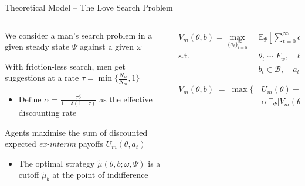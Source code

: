 \documentclass[10pt, aspectratio=169,xcolor=dvipsnames]{beamer}
\makeatletter
\newenvironment{myitemize}{%
   \setlength{\topsep}{0pt}
   \setlength{\partopsep}{0pt}
   \itemize
}{\enditemize}
\makeatother
\begin{document}
\begin{frame}{Theoretical Model – The Love Search Problem}
\begin{columns}
\begin{column}{0.45\textwidth}
\begin{myitemize}
\setlength\itemsep{1em}
    \item We consider a man's search problem in a given steady state $\Psi$ against a given $\omega$
    \item With friction-less search, men get suggestions at a rate $\tau=\min\{\frac{N_w}{N_m} ,1\}$ 
    \begin{itemize}
    \setlength\itemsep{0.5em} 
    \item Define $\alpha=\frac{\tau\delta}{1-\delta(1-\tau)}$ as the effective discounting rate
    \end{itemize}
    \item Agents maximise the sum of discounted expected \textit{ex-interim} payoffs $U_m(\theta, a_t)$ 
    \begin{itemize}
    \setlength\itemsep{0.5em} 
    \item The optimal strategy $\widetilde\mu(\theta,b;\omega,\Psi)$ is a cutoff $\widetilde\mu_b$ at the point of indifference
    \end{itemize}
    
    
\end{myitemize}
\end{column}
\begin{column}{0.55\textwidth}
\begin{equation*}
\begin{aligned}V_m(\theta,b)= \max_{\{a_t\}^\infty_{t=0}} \;& \mathbb{E}_{\Psi}\left[\sum^\infty_{t=0} \alpha^{t} U_m(\theta_t,a_t)\;|\; \theta_0,b_0=\theta,b\right]\\ \textrm{s.t.}\; & \theta_t \sim F_w,\quad b_{t+1}  = b_t - a_t \\ &b_t\in \mathcal{B}, \quad a_t\in \mathcal{A} \end{aligned}
\end{equation*}

\begin{equation*}\begin{aligned} V_m(\theta,b) \;=\;\max\Big\{\,& U_m(\theta) +\alpha \,\mathbb{E}_{\Psi}\Big[V_m(\theta', b-1)\Big]\,,\\ & \alpha\,\mathbb{E}_\Psi\Big[ V_m(\theta', b)\Big]\,\Big\} \end{aligned} \end{equation*}  


\end{column}
\end{columns}
\end{frame}
\end{document}
